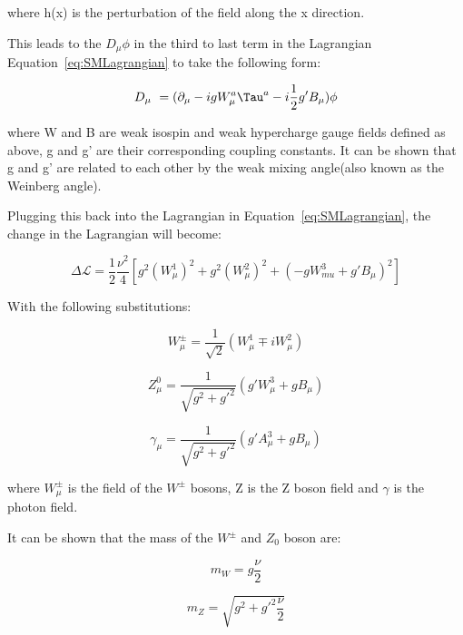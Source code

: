 where h(x) is the perturbation of the field along the x direction.

This leads to the $D_{\mu} \phi$ in the third to last term in the Lagrangian Equation~\ref{eq:SMLagrangian} to take the following form:

\begin{equation}
    D_{\mu}\ = (\partial_{\mu}- ig W_{\mu}^{a}\Tau^{a} - i\frac{1}{2}g' B_{\mu}) \phi
\end{equation}

where W and B are weak isospin and weak hypercharge gauge fields defined as above, g and g' are their corresponding coupling constants. It can be shown that g and g' are related to each other by the weak mixing angle(also known as the Weinberg angle). 

Plugging this back into the Lagrangian in Equation~\ref{eq:SMLagrangian}, the change in the Lagrangian will become:

\begin{equation}
    \Delta \mathcal{L} = \frac{1}{2} \frac{\nu^{2}}{4}[g^{2}(W^{1}_{\mu})^2 + g^{2}(W_{\mu}^{2})^{2} + (-g W_{mu}^{3}+ g'B_{\mu})^2]
\end{equation}

With the following substitutions:

\begin{equation}
    W^{\pm}_{\mu} = \frac{1}{\sqrt{2}}(W_{\mu}^{1} \mp iW^{2}_{\mu}) 
\end{equation}

\begin{equation}
    Z^{0}_{\mu}=\frac{1}{\sqrt{g^{2}+g'^{2}}}(g'W_{\mu}^{3} + gB_{\mu})
\end{equation}

\begin{equation}
    \gamma_{\mu} = \frac{1}{\sqrt{g^{2}+g'^{2}}}(g'A^{3}_{\mu} + g B_{\mu})
\end{equation}

where $W^{\pm}_{\mu}$ is the field of the $W^{\pm}$ bosons, Z is the Z boson field and $\gamma$ is the photon field. 

It can be shown that the mass of the $W^{\pm}$ and $Z_{0}$ boson are:

\begin{equation}
    m_{W} = g \frac{\nu}{2}
\end{equation}

\begin{equation}
    m_{Z} = \sqrt{g^{2}+ g'^{2}\frac{\nu}{2}}
\end{equation}

